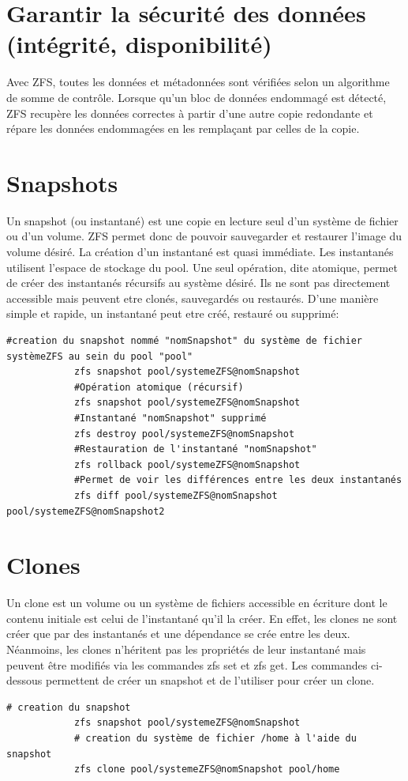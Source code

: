 \documentclass[a4paper]{report}
\begin{document}
	\section{Garantir la sécurité des données (intégrité, disponibilité)}
		Avec ZFS, toutes les données et métadonnées sont vérifiées selon un algorithme de somme de contrôle. Lorsque qu'un bloc de données endommagé est détecté, ZFS recupère les données correctes à partir d'une autre copie redondante et répare les données endommagées en les remplaçant par celles de la copie.
	\section{Snapshots}
		Un snapshot (ou instantané) est une copie en lecture seul d'un système de fichier ou d'un volume. ZFS permet donc de pouvoir sauvegarder et restaurer l'image du volume désiré. La création d'un instantané est quasi immédiate. Les instantanés utilisent l'espace de stockage du pool. Une seul opération, dite atomique, permet de créer des instantanés récursifs au système désiré. Ils ne sont pas directement accessible mais peuvent etre clonés, sauvegardés ou restaurés. D'une manière simple et rapide, un instantané peut etre créé, restauré ou supprimé:
		\begin{lstlisting}[language=ksh,texcl]
			#creation du snapshot nommé "nomSnapshot" du système de fichier systèmeZFS au sein du pool "pool"
			zfs snapshot pool/systemeZFS@nomSnapshot
			#Opération atomique (récursif)
			zfs snapshot pool/systemeZFS@nomSnapshot 
			#Instantané "nomSnapshot" supprimé
			zfs destroy pool/systemeZFS@nomSnapshot 
			#Restauration de l'instantané "nomSnapshot"
			zfs rollback pool/systemeZFS@nomSnapshot 
			#Permet de voir les différences entre les deux instantanés
			zfs diff pool/systemeZFS@nomSnapshot pool/systemeZFS@nomSnapshot2 
		\end{lstlisting}
	\section{Clones}
		Un clone est un volume ou un système de fichiers accessible en écriture dont le contenu initiale est celui de l'instantané qu'il la créer. En effet, les clones ne sont créer que par des instantanés et une dépendance se crée entre les deux. Néanmoins, les clones n'héritent pas les propriétés de leur instantané mais peuvent être modifiés via les commandes zfs set et zfs get. Les commandes ci-dessous permettent de créer un snapshot et de l'utiliser pour créer un clone.
		\begin{lstlisting}[language=ksh,texcl]
			# creation du snapshot
			zfs snapshot pool/systemeZFS@nomSnapshot 
			# creation du système de fichier /home à l'aide du snapshot
			zfs clone pool/systemeZFS@nomSnapshot pool/home 
		\end{lstlisting}
\end{document}
